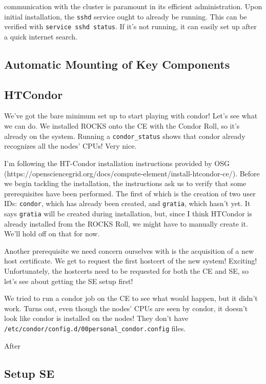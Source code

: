 \documentclass[12pt]{article}
\begin{document}
 communication with the cluster is paramount in its efficient
administration. Upon initial installation, the {\tt sshd} service ought to
already be running. This can be verified with {\tt service sshd status}. If it's
not running, it can easily set up after a quick internet search.

\subsection{Automatic Mounting of Key Components}

\subsection{HTCondor}

\qq We've got the bare minimum set up to start playing with condor! Let's see
what we can do. We installed ROCKS onto the CE with the Condor Roll, so it's
already on the system. Running a {\tt condor\_status} shows that condor already
recognizes all the nodes' CPUs! Very nice. 

\qq I'm following the HT-Condor installation instructions provided by OSG
(https://opensciencegrid.org/docs/compute-element/install-htcondor-ce/). Before
we begin tackling the installation, the instructions ask us to verify that some
prerequisites have been performed. The first of which is the creation of two
user IDs: {\tt condor}, which has already been created, and {\tt gratia}, which
hasn't yet. It says {\tt gratia} will be created during installation, but, since
I think HTCondor is already installed from the ROCKS Roll, we might have to
manually create it. We'll hold off on that for now.

\qq Another prerequisite we need concern ourselves with is the acquisition of a
new host certificate. We get to request the first hostcert of the new system!
Exciting! Unfortunately, the hostcerts need to be requested for both the CE and
SE, so let's see about getting the SE setup first!

\qq We tried to run a condor job on the CE to see what would happen, but it
didn't work. Turns out, even though the nodes' CPUs are seen by condor, it
doesn't look like condor is installed on the nodes! They don't have {\tt
  /etc/condor/config.d/00personal\_condor.config} files. 

\qq After

\subsection{Setup SE}
\end{document}
